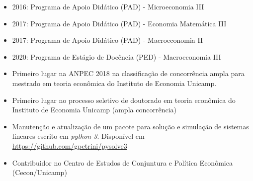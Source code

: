 \documentclass[11pt,a4paper]{article}
\begin{document}
\begin{itemize}
	\item 2016: Programa de Apoio Didático (PAD) - Microeconomia III
	\item 2017: Programa de Apoio Didático (PAD) - Economia Matemática III
	\item 2017: Programa de Apoio Didático (PAD) - Macroeconomia II
	\item 2020: Programa de Estágio de Docência (PED) - Macroeconomia III
	\item Primeiro lugar na ANPEC 2018 na classificação de concorrência ampla para mestrado em teoria econômica do Instituto de Economia Unicamp.
	\item Primeiro lugar no processo seletivo de doutorado em teoria econômica do Instituto de Economia Unicamp (ampla concorrência)
	\item Manutenção e atualização de um pacote para solução e simulação de sistemas lineares escrito em \textit{python 3}. Disponível em \url{https://github.com/gpetrini/pysolve3}
	\item Contribuidor no Centro de Estudos de Conjuntura e Política Econômica (Cecon/Unicamp)
\end{itemize}
\end{document}
